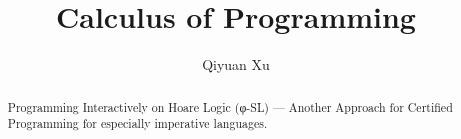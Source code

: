 \documentclass{llncs}
\begin{document}
\title{Calculus of Programming}
\author{Qiyuan Xu}

\maketitle

\begin{abstract}
Programming Interactively on Hoare Logic (φ-SL)
          --- Another Approach for Certified Programming for especially imperative languages.
\end{abstract}











\end{document}
